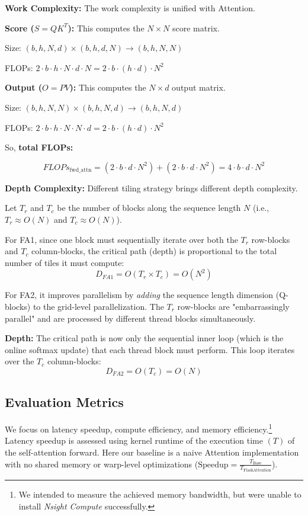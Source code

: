 \documentclass[11pt]{article}
\begin{document}
\textbf{Work Complexity: } The work complexity is unified with Attention. 


\textbf{Score ($S = QK^T$):} This computes the $N \times N$ score matrix.

Size: $(b, h, N, d) \times (b, h, d, N) \rightarrow (b, h, N, N)$

FLOPs: $2 \cdot b \cdot h \cdot N \cdot d \cdot N = 2 \cdot b \cdot (h \cdot d) \cdot N^2$

\textbf{Output ($O = PV$):} This computes the $N \times d$ output matrix.

Size: $(b, h, N, N) \times (b, h, N, d) \rightarrow (b, h, N, d)$

FLOPs: $2 \cdot b \cdot h \cdot N \cdot N \cdot d = 2 \cdot b \cdot (h \cdot d) \cdot N^2$


So, \textbf{total FLOPs:}

$$ FLOPs_{\text{fwd\_attn}} = (2 \cdot b \cdot d \cdot N^2) + (2 \cdot b \cdot d \cdot N^2) = 4 \cdot b \cdot d \cdot N^2 $$


\textbf{Depth Complexity: }
Different tiling strategy brings different depth complexity.

Let $T_r$ and $T_c$ be the number of blocks along the sequence length $N$ (i.e., $T_r \approx O(N)$ and $T_c \approx O(N)$).


For FA1, since one block must sequentially iterate over both the $T_r$ row-blocks and $T_c$ column-blocks, the critical path (depth) is proportional to the total number of tiles it must compute:
              \[ D_{FA1} = O(T_r \times T_c) = O(N^2) \]

For FA2, it improves parallelism by \textit{adding} the sequence length dimension (Q-blocks) to the grid-level parallelization. The $T_r$ row-blocks are "embarrassingly parallel" and are processed by different thread blocks simultaneously.

\textbf{Depth:} The critical path is now only the sequential inner loop (which is the online softmax update) that each thread block must perform. This loop iterates over the $T_c$ column-blocks:
              \[ D_{FA2} = O(T_c) = O(N) \]



\subsection{Evaluation Metrics}
We focus on latency speedup, compute efficiency, and memory efficiency.\footnote{We intended to measure the achieved memory bandwidth, but were unable to install \textit{Nsight Compute} successfully.} Latency speedup is assessed using kernel runtime of the execution time $(T)$ of the self-attention forward. Here our baseline is a naive Attention implementation with no shared memory or warp-level optimizations ($\text{Speedup} = \frac{T_{\text{Base}}}{T_{\text{FlashAttention}}}$).
\end{document}
